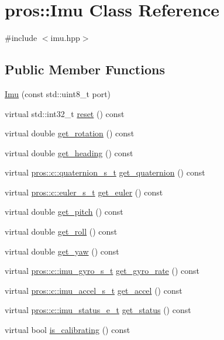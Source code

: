 \hypertarget{classpros_1_1Imu}{}\section{pros\+:\+:Imu Class Reference}
\label{classpros_1_1Imu}


{\ttfamily \#include $<$imu.\+hpp$>$}

\subsection*{Public Member Functions}
\begin{DoxyCompactItemize}
\item 
\hyperlink{classpros_1_1Imu_aac194322ec0563c1c73f540733e7cc4e}{Imu} (const std\+::uint8\+\_\+t port)
\item 
virtual std\+::int32\+\_\+t \hyperlink{classpros_1_1Imu_ad7973cfad5f8f83e7007342055197c43}{reset} () const
\item 
virtual double \hyperlink{classpros_1_1Imu_ac8bd7a19a6b4fc0c207a895efd3f0b48}{get\+\_\+rotation} () const
\item 
virtual double \hyperlink{classpros_1_1Imu_a35c7953c5def3c034763af25c4dbebe3}{get\+\_\+heading} () const
\item 
virtual \hyperlink{imu_8h_a1f3d4bf4251e6ce7cb374297de6390a1}{pros\+::c\+::quaternion\+\_\+s\+\_\+t} \hyperlink{classpros_1_1Imu_a3656b2476bb3ab8c2539615f76a0db39}{get\+\_\+quaternion} () const
\item 
virtual \hyperlink{imu_8h_a93e80020ec907b7e11ac7166e5d01c55}{pros\+::c\+::euler\+\_\+s\+\_\+t} \hyperlink{classpros_1_1Imu_acd2f926bc97121518da774eefe6fc9e2}{get\+\_\+euler} () const
\item 
virtual double \hyperlink{classpros_1_1Imu_a9d9e7ad1da6ea8877c48e1b4fadfe8ee}{get\+\_\+pitch} () const
\item 
virtual double \hyperlink{classpros_1_1Imu_a8ec8c7bbb7ee9d9d1c9dca5d992c57b1}{get\+\_\+roll} () const
\item 
virtual double \hyperlink{classpros_1_1Imu_aa2dd2dec5b1a91d4358c23afd8f0f1bd}{get\+\_\+yaw} () const
\item 
virtual \hyperlink{imu_8h_a5b9e240cfb181cce3c741e29efbbbf23}{pros\+::c\+::imu\+\_\+gyro\+\_\+s\+\_\+t} \hyperlink{classpros_1_1Imu_a632aecd3cf0866827ba6521dc19f357d}{get\+\_\+gyro\+\_\+rate} () const
\item 
virtual \hyperlink{imu_8h_a70eb3173193f4f46266eade4c243f662}{pros\+::c\+::imu\+\_\+accel\+\_\+s\+\_\+t} \hyperlink{classpros_1_1Imu_ac9a047f46e7ae8d73a6189091df20150}{get\+\_\+accel} () const
\item 
virtual \hyperlink{imu_8h_a7d3682de24c3a459dddda55d65793309}{pros\+::c\+::imu\+\_\+status\+\_\+e\+\_\+t} \hyperlink{classpros_1_1Imu_ad38c8f55b89f8d2e7b68a6bda0029559}{get\+\_\+status} () const
\item 
virtual bool \hyperlink{classpros_1_1Imu_af7426c086f6f810cca98f4e77765189c}{is\+\_\+calibrating} () const
\end{DoxyCompactItemize}


